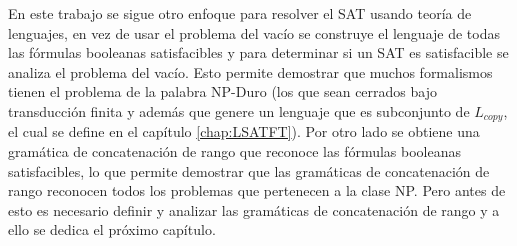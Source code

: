 En este trabajo se sigue otro enfoque para resolver el SAT usando teoría de lenguajes, en vez de usar el problema del vacío se 
construye el lenguaje de todas las fórmulas booleanas satisfacibles y para determinar si un SAT es satisfacible 
se analiza el problema del vacío. Esto permite demostrar que muchos formalismos tienen el problema de la palabra 
NP-Duro (los que sean cerrados bajo transducción finita 
y además que genere un lenguaje que es subconjunto de $L_{copy}$, el cual se define en el capítulo 
\ref{chap:LSATFT}). Por otro lado se obtiene una gramática de concatenación de rango que reconoce las fórmulas 
booleanas satisfacibles, lo que permite demostrar que las gramáticas de concatenación de rango reconocen todos 
los problemas que pertenecen a la clase NP. Pero antes de esto es necesario definir y analizar las gramáticas 
de concatenación de rango y a ello se dedica el próximo capítulo.